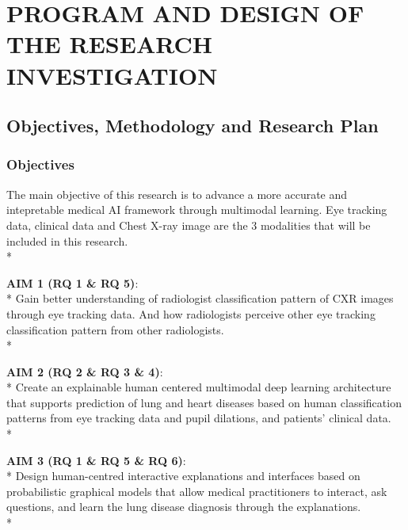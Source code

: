 \section{PROGRAM AND DESIGN OF THE RESEARCH INVESTIGATION}
\label{sec:research-design}

\subsection{Objectives, Methodology and Research Plan}

\subsubsection{Objectives}
The main objective of this research is to advance a more accurate and intepretable medical AI framework through multimodal learning. Eye tracking data, clinical data and Chest X-ray image are the 3 modalities that will be included in this research.\\*

\noindent
\textbf{AIM 1 (RQ 1 \& RQ 5)}:\\*
Gain better understanding of radiologist classification pattern of CXR images through eye tracking data. And how radiologists perceive other eye tracking classification pattern from other radiologists. \\*

\noindent
\textbf{AIM 2 (RQ 2 \& RQ 3 \& 4)}:\\*
Create an explainable human centered multimodal deep learning architecture that supports prediction of lung and heart diseases based on human classification patterns from eye tracking data and pupil dilations, and patients' clinical data.\\*


\noindent
\textbf{AIM 3 (RQ 1 \& RQ 5 \& RQ 6)}:\\*
Design human-centred interactive explanations and interfaces based on probabilistic graphical models that allow medical practitioners to interact, ask questions, and learn the lung disease diagnosis through the explanations. \\*

